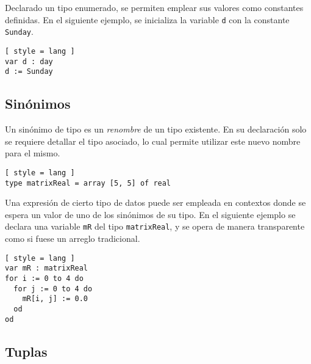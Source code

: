Declarado un tipo enumerado, se permiten emplear sus valores como constantes definidas.
En el siguiente ejemplo, se inicializa la variable \lstinline[style = lang]{d} con la constante \lstinline[style = lang]{Sunday}.

\begin{lstlisting}[ style = lang ]
var d : day
d := Sunday
\end{lstlisting}

\subsection{Sinónimos}

Un sinónimo de tipo es un \textit{renombre} de un tipo existente.
En su declaración solo se requiere detallar el tipo asociado, lo cual permite utilizar este nuevo nombre para el mismo.

\begin{lstlisting}[ style = lang ]
type matrixReal = array [5, 5] of real
\end{lstlisting}

Una expresión de cierto tipo de datos puede ser empleada en contextos donde se espera un valor de uno de los sinónimos de su tipo.
En el siguiente ejemplo se declara una variable \lstinline[style = lang]{mR} del tipo \lstinline[style = lang]{matrixReal}, y se opera de manera transparente como si fuese un arreglo tradicional.

\begin{lstlisting}[ style = lang ]
var mR : matrixReal
for i := 0 to 4 do
  for j := 0 to 4 do
    mR[i, j] := 0.0
  od
od
\end{lstlisting}

\subsection{Tuplas}

